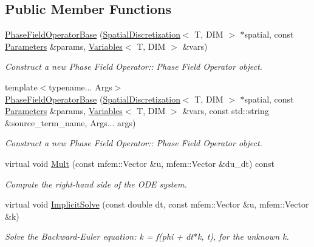 \subsection*{Public Member Functions}
\begin{DoxyCompactItemize}
\item 
\hyperlink{classPhaseFieldOperatorBase_ae67f14dad2267b47a866e6f1dfb1f39b}{Phase\+Field\+Operator\+Base} (\hyperlink{classSpatialDiscretization}{Spatial\+Discretization}$<$ T, D\+IM $>$ $\ast$spatial, const \hyperlink{classParameters}{Parameters} \&params, \hyperlink{classVariables}{Variables}$<$ T, D\+IM $>$ \&vars)
\begin{DoxyCompactList}\small\item\em Construct a new Phase Field Operator\+:\+: Phase Field Operator object. \end{DoxyCompactList}\item 
{\footnotesize template$<$typename... Args$>$ }\\\hyperlink{classPhaseFieldOperatorBase_ae5590fe61c4339f3c22ccf7f40868500}{Phase\+Field\+Operator\+Base} (\hyperlink{classSpatialDiscretization}{Spatial\+Discretization}$<$ T, D\+IM $>$ $\ast$spatial, const \hyperlink{classParameters}{Parameters} \&params, \hyperlink{classVariables}{Variables}$<$ T, D\+IM $>$ \&vars, const std\+::string \&source\+\_\+term\+\_\+name, Args... args)
\begin{DoxyCompactList}\small\item\em Construct a new Phase Field Operator\+:\+: Phase Field Operator object. \end{DoxyCompactList}\item 
virtual void \hyperlink{classPhaseFieldOperatorBase_a55a314426a0d9bbb181cb5d35e8f76e9}{Mult} (const mfem\+::\+Vector \&u, mfem\+::\+Vector \&du\+\_\+dt) const
\begin{DoxyCompactList}\small\item\em Compute the right-\/hand side of the O\+DE system. \end{DoxyCompactList}\item 
virtual void \hyperlink{classPhaseFieldOperatorBase_ac1be84d201e35ba329090cdda6a4bfc5}{Implicit\+Solve} (const double dt, const mfem\+::\+Vector \&u, mfem\+::\+Vector \&k)
\begin{DoxyCompactList}\small\item\em Solve the Backward-\/\+Euler equation\+: k = f(phi + dt$\ast$k, t), for the unknown k. \end{DoxyCompactList}\item 

\end{DoxyCompactItemize}
